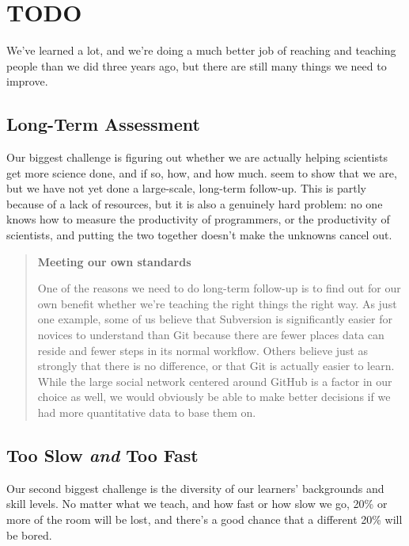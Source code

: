\documentclass[10pt,a4paper,twocolumn]{article}
\begin{document}
\section{TODO}

We've learned a lot, and we're doing a much better job of reaching and
teaching people than we did three years ago, but there are still many
things we need to improve.

\subsection{Long-Term Assessment}\label{s:assessment}

Our biggest challenge is figuring out whether we are actually helping
scientists get more science done, and if so, how, and how much.
\cite{aranda2012,libarkin2012,schossau2014,simperler2015} seem to show
that we are, but we have not yet done a large-scale, long-term
follow-up. This is partly because of a lack of resources, but it is
also a genuinely hard problem: no one knows how to measure the
productivity of programmers, or the productivity of scientists, and
putting the two together doesn't make the unknowns cancel out.

\begin{quote}
\textbf{Meeting our own standards}

One of the reasons we need to do long-term follow-up is to find out
for our own benefit whether we're teaching the right things the right
way.  As just one example, some of us believe that Subversion is
significantly easier for novices to understand than Git because there
are fewer places data can reside and fewer steps in its normal
workflow. Others believe just as strongly that there is no difference,
or that Git is actually easier to learn. While the large social
network centered around GitHub is a factor in our choice as well, we
would obviously be able to make better decisions if we had more
quantitative data to base them on.
\end{quote}

\subsection{Too Slow \emph{and} Too Fast}\label{s:instruction-pace}

Our second biggest challenge is the diversity of our learners'
backgrounds and skill levels. No matter what we teach, and how fast or
how slow we go, 20\% or more of the room will be lost, and there's a
good chance that a different 20\% will be bored.
\end{document}
